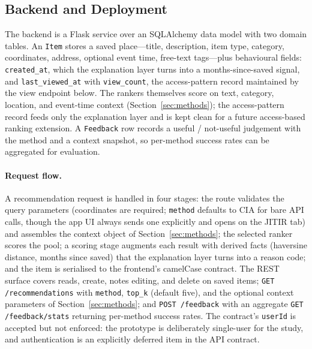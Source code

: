 \documentclass[acmlarge]{acmart}
\begin{document}
\subsection{Backend and Deployment}
\label{sec:backend}

The backend is a Flask service over an SQLAlchemy data model with two
domain tables. An \texttt{Item} stores a saved place---title, description,
item type, category, coordinates, address, optional event time, free-text
tags---plus behavioural fields: \texttt{created\_at}, which the
explanation layer turns into a months-since-saved signal, and
\texttt{last\_viewed\_at} with \texttt{view\_count}, the access-pattern
record maintained by the view endpoint below. The rankers themselves score
on text, category, location, and event-time context
(Section~\ref{sec:methods}); the access-pattern record feeds only the
explanation layer and is kept clean for a future access-based ranking
extension. A \texttt{Feedback} row records a useful / not-useful judgement
with the method and a context snapshot, so per-method success rates can be
aggregated for evaluation.

\paragraph{Request flow.}
A recommendation request is handled in four stages: the route validates
the query parameters (coordinates are required; \texttt{method} defaults
to CIA for bare API calls, though the app UI always sends one explicitly
and opens on the JITIR tab) and assembles the context object of
Section~\ref{sec:methods}; the selected ranker scores the pool; a scoring
stage augments each result with derived facts (haversine distance, months
since saved) that the explanation layer turns into a reason code; and the
item is serialised to the frontend's camelCase contract. The REST surface
covers reads, create, notes editing, and delete on saved items;
\texttt{GET /recommendations} with \texttt{method}, \texttt{top\_k}
(default five), and the optional context parameters of
Section~\ref{sec:methods}; and \texttt{POST /feedback} with an aggregate
\texttt{GET /feedback/stats} returning per-method success rates. The
contract's \texttt{userId} is accepted but not enforced: the prototype is
deliberately single-user for the study, and authentication is an
explicitly deferred item in the API contract.
\end{document}
